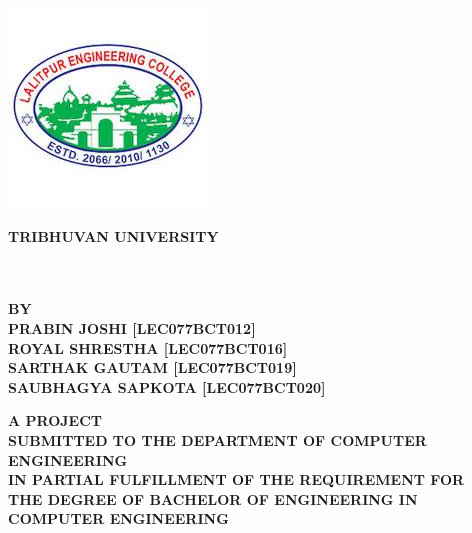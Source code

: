 \thispagestyle{empty}
\begin{center}
\begin{spacing}{1.6}

\includegraphics[scale=0.75]{img/Graphics/LOGO.jpeg}

\textbf{
\large{TRIBHUVAN UNIVERSITY}\\
\MakeUppercase{\large{\theinstitute}}\\
\MakeUppercase{\large{\thecampus}}}

\vspace{0.5cm}

\textbf{\MakeUppercase{\thetitle}\\
\vspace{0.5cm} 
BY \\ 
\MakeUppercase{
Prabin joshi [lec077bct012]\\
Royal shrestha [lec077bct016]\\
Sarthak gautam [lec077bct019]\\
Saubhagya sapkota [lec077bct020]\\
}}

\vspace{0.5cm}

\textbf{A PROJECT \\
SUBMITTED TO THE DEPARTMENT OF COMPUTER ENGINEERING\\ IN PARTIAL FULFILLMENT OF THE REQUIREMENT FOR\\ THE DEGREE OF BACHELOR OF ENGINEERING IN COMPUTER ENGINEERING}
\bigskip

\par
\textbf{\MakeUppercase{\thedepartment}}\\
\textbf{\MakeUppercase{\thedepartmentAddress}}
\vspace{1cm}

\textbf{\MakeUppercase{\thedate}}


\end{spacing}
\end{center}

\clearpage